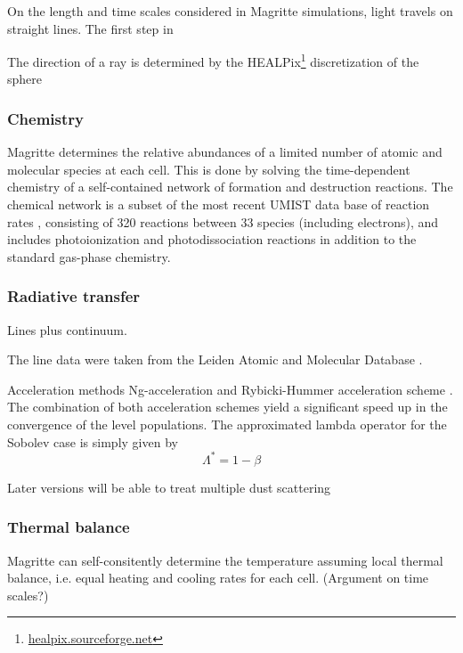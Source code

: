 \documentclass[a4paper,fleqn,usenatbib]{mnras}
\begin{document}
On the length and time scales considered in Magritte simulations, light travels on straight lines. The first step in

The direction of a ray is determined by the HEALPix\footnote{\href{http://healpix.sourceforge.net}{healpix.sourceforge.net}} discretization of the sphere \citet{Gorski2005}

\subsubsection{Chemistry}

Magritte determines the relative abundances of a limited number of atomic and molecular species at each cell. This is done by solving the time-dependent chemistry of a self-contained network of formation and destruction reactions. The chemical network is a subset of the most recent UMIST data base of reaction rates \citet{Woodall2007}, consisting of 320 reactions between 33 species (including electrons), and includes photoionization and photodissociation reactions in addition to the standard gas-phase chemistry.

\subsubsection{Radiative transfer}

Lines plus continuum.

The line data were taken from the Leiden Atomic and Molecular Database \citep[LAMDA,][]{Schoier2005}.

Acceleration methods Ng-acceleration \citet{Ng1974} and Rybicki-Hummer acceleration scheme \citet{Rybicki1991}. The combination of both acceleration schemes yield a significant speed up in the convergence of the level populations.
The approximated lambda operator for the Sobolev case is simply given by
\begin{equation}
	\Lambda^{\ast} = 1 - \beta
\end{equation}

Later versions will be able to treat multiple dust scattering

\subsubsection{Thermal balance}

Magritte can self-consitently determine the temperature assuming local thermal balance, i.e. equal heating and cooling rates for each cell. (Argument on time scales?)
\end{document}
